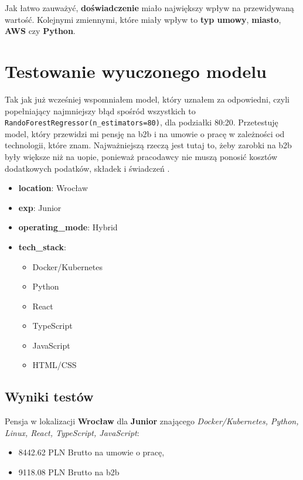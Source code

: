 \documentclass[a4paper]{article}
\begin{document}
\quad Jak łatwo zauważyć, \textbf{doświadczenie} miało największy wpływ na przewidywaną wartość.
Kolejnymi zmiennymi, które miały wpływ to \textbf{typ umowy}, \textbf{miasto}, \textbf{AWS} czy \textbf{Python}.

\newpage

\section{Testowanie wyuczonego modelu}

\quad Tak jak już wcześniej wspomniałem model, który uznałem za odpowiedni, czyli popełniający najmniejszy błąd
spośród wszystkich to \texttt{RandoForestRegressor(n\_estimators=80)}, dla podziałki 80:20.
Przetestuję model, który przewidzi mi pensję na b2b i na umowie o pracę w zależności od technologii, które znam. Najważniejszą rzeczą jest tutaj to, żeby zarobki na b2b były większe niż na uopie,
ponieważ pracodawcy nie muszą ponosić kosztów dodatkowych podatków, składek i świadczeń \cite{uop_vs_b2b}.

\begin{itemize}
    \item \textbf{location}: Wrocław
    \item \textbf{exp}: Junior
    \item \textbf{operating\_mode}: Hybrid
    \item \textbf{tech\_stack}:
          \begin{itemize}
              \item Docker/Kubernetes
              \item Python
              \item React
              \item TypeScript
              \item JavaScript
              \item HTML/CSS
          \end{itemize}
\end{itemize}

\subsection{Wyniki testów}

\quad Pensja w lokalizacji \textbf{Wrocław} dla \textbf{Junior} znającego \textit{Docker/Kubernetes, Python, Linux, React, TypeScript, JavaScript}:

\begin{itemize}
    \item 8442.62 PLN Brutto na umowie o pracę,
    \item 9118.08 PLN Brutto na b2b
\end{itemize}
\end{document}

